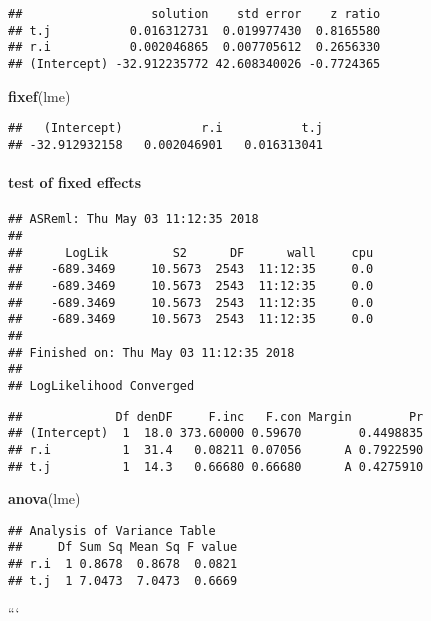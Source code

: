 \documentclass[]{article}
\newenvironment{Shaded}{\begin{snugshade}}{\end{snugshade}}
\newcommand{\KeywordTok}[1]{\textcolor[rgb]{0.13,0.29,0.53}{\textbf{#1}}}
\newcommand{\DataTypeTok}[1]{\textcolor[rgb]{0.13,0.29,0.53}{#1}}
\newcommand{\StringTok}[1]{\textcolor[rgb]{0.31,0.60,0.02}{#1}}
\newcommand{\OperatorTok}[1]{\textcolor[rgb]{0.81,0.36,0.00}{\textbf{#1}}}
\newcommand{\NormalTok}[1]{#1}
\let\oldparagraph\paragraph
\renewcommand{\paragraph}[1]{\oldparagraph{#1}\mbox{}}
\begin{document}
\begin{verbatim}
##                  solution    std error    z ratio
## t.j           0.016312731  0.019977430  0.8165580
## r.i           0.002046865  0.007705612  0.2656330
## (Intercept) -32.912235772 42.608340026 -0.7724365
\end{verbatim}

\begin{Shaded}
\begin{Highlighting}[]
\KeywordTok{fixef}\NormalTok{(lme)}
\end{Highlighting}
\end{Shaded}

\begin{verbatim}
##   (Intercept)           r.i           t.j 
## -32.912932158   0.002046901   0.016313041
\end{verbatim}

\paragraph{test of fixed effects}\label{test-of-fixed-effects}

\begin{Shaded}
\end{Shaded}

\begin{verbatim}
## ASReml: Thu May 03 11:12:35 2018
## 
##      LogLik         S2      DF      wall     cpu
##    -689.3469     10.5673  2543  11:12:35     0.0
##    -689.3469     10.5673  2543  11:12:35     0.0
##    -689.3469     10.5673  2543  11:12:35     0.0
##    -689.3469     10.5673  2543  11:12:35     0.0
## 
## Finished on: Thu May 03 11:12:35 2018
##  
## LogLikelihood Converged
\end{verbatim}

\begin{verbatim}
##             Df denDF     F.inc   F.con Margin        Pr
## (Intercept)  1  18.0 373.60000 0.59670        0.4498835
## r.i          1  31.4   0.08211 0.07056      A 0.7922590
## t.j          1  14.3   0.66680 0.66680      A 0.4275910
\end{verbatim}

\begin{Shaded}
\begin{Highlighting}[]
\KeywordTok{anova}\NormalTok{(lme)}
\end{Highlighting}
\end{Shaded}

\begin{verbatim}
## Analysis of Variance Table
##     Df Sum Sq Mean Sq F value
## r.i  1 0.8678  0.8678  0.0821
## t.j  1 7.0473  7.0473  0.6669
\end{verbatim}

```
\end{document}

